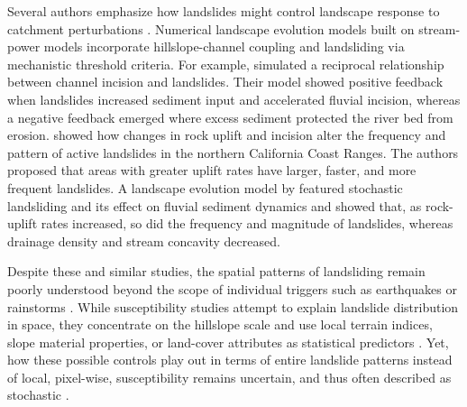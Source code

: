 \documentclass[draft]{agujournal2019}
\begin{document}
\par Several authors emphasize how landslides might control landscape response to catchment perturbations \cite{montgomery2001slope}. Numerical landscape evolution models built on stream-power models incorporate hillslope-channel coupling and landsliding via mechanistic threshold criteria. For example,  simulated a reciprocal relationship between channel incision and landslides. Their model showed positive feedback when landslides increased sediment input and accelerated fluvial incision, whereas a negative feedback emerged where excess sediment protected the river bed from erosion.  showed how changes in rock uplift and incision alter the frequency and pattern of active landslides in the northern California Coast Ranges. The authors proposed that areas with greater uplift rates have larger, faster, and more frequent landslides. A landscape evolution model by  featured stochastic landsliding and its effect on fluvial sediment dynamics and showed that, as rock-uplift rates increased, so did the frequency and magnitude of landslides, whereas drainage density and stream concavity decreased.

\par Despite these and similar studies, the spatial patterns of landsliding remain poorly understood beyond the scope of individual triggers such as earthquakes or rainstorms \cite{yanites2018}. While susceptibility studies attempt to explain landslide distribution in space, they concentrate on the hillslope scale and use local terrain indices, slope material properties, or land-cover attributes as statistical predictors \cite{reichenbach2018, soeters1996, montgomery1994}. Yet, how these possible controls play out in terms of entire landslide patterns instead of local, pixel-wise, susceptibility remains uncertain, and thus often described as stochastic \cite{Benda1997}. 
\end{document}
